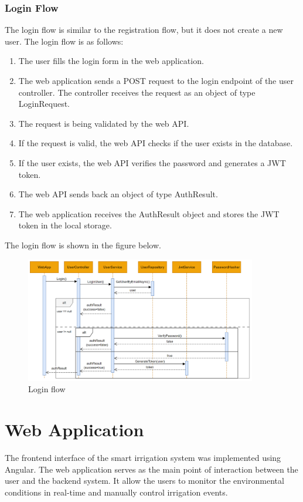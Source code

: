 \subsubsection{Login Flow}
The login flow is similar to the registration flow, but it does not create a new user.
The login flow is as follows:
\begin{enumerate}
    \item The user fills the login form in the web application.
    \item The web application sends a POST request to the login endpoint of the user controller. The controller
    receives the request as an object of type LoginRequest.
    \item The request is being validated by the web API.
    \item If the request is valid, the web API checks if the user exists in the database.
    \item If the user exists, the web API verifies the password and generates a JWT token.
    \item The web API sends back an object of type AuthResult.
    \item The web application receives the AuthResult object and stores the JWT token in the local storage.
\end{enumerate}

The login flow is shown in the figure below.
\begin{figure}[H]
    \centering
    \includegraphics[width=0.9\textwidth]{images/login-flow.png}
    \caption{Login flow}
    \label{fig:login-flow}
\end{figure}

\section {Web Application}
The frontend interface of the smart irrigation system was implemented using Angular. The web application serves as the main
point of interaction between the user and the backend system. It allow the users to monitor the environmental conditions
in real-time and manually control irrigation events.

